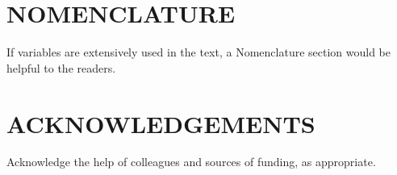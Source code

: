 \documentclass[letterpaper]{physor2020}
\begin{document}

\section*{NOMENCLATURE}

If variables are extensively used in the text, a Nomenclature section would be helpful to the readers.

\section*{ACKNOWLEDGEMENTS}

Acknowledge the help of colleagues and sources of funding, as appropriate.

\setlength{\baselineskip}{12pt}



\end{document}
